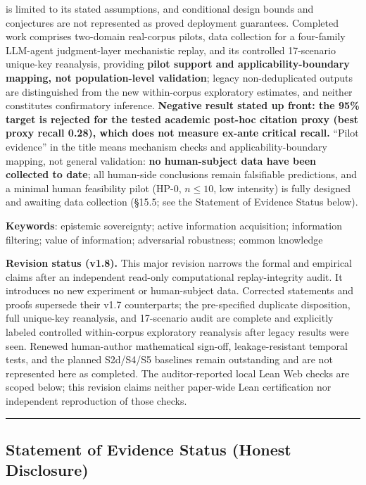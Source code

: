 \documentclass[
  11pt]{article}
\begin{document}
is limited to its stated assumptions, and conditional design bounds and
conjectures are not represented as proved deployment guarantees.
Completed work comprises two-domain real-corpus pilots, data collection
for a four-family LLM-agent judgment-layer mechanistic replay, and its
controlled 17-scenario unique-key reanalysis, providing \textbf{pilot
support and applicability-boundary mapping, not population-level
validation}; legacy non-deduplicated outputs are distinguished from the
new within-corpus exploratory estimates, and neither constitutes
confirmatory inference. \textbf{Negative result stated up front: the
95\% target is rejected for the tested academic post-hoc citation proxy
(best proxy recall 0.28), which does not measure ex-ante critical
recall.} ``Pilot evidence'' in the title means mechanism checks and
applicability-boundary mapping, not general validation: \textbf{no
human-subject data have been collected to date}; all human-side
conclusions remain falsifiable predictions, and a minimal human
feasibility pilot (HP-0, \(n \le 10\), low intensity) is fully designed
and awaiting data collection (§15.5; see the Statement of Evidence
Status below).

\textbf{Keywords}: epistemic sovereignty; active information
acquisition; information filtering; value of information; adversarial
robustness; common knowledge

\textbf{Revision status (v1.8).} This major revision narrows the formal
and empirical claims after an independent read-only computational
replay-integrity audit. It introduces no new experiment or human-subject
data. Corrected statements and proofs supersede their v1.7 counterparts;
the pre-specified duplicate disposition, full unique-key reanalysis, and
17-scenario audit are complete and explicitly labeled controlled
within-corpus exploratory reanalysis after legacy results were seen.
Renewed human-author mathematical sign-off, leakage-resistant temporal
tests, and the planned S2d/S4/S5 baselines remain outstanding and are
not represented here as completed. The auditor-reported local Lean Web
checks are scoped below; this revision claims neither paper-wide Lean
certification nor independent reproduction of those checks.

\begin{center}\rule{0.5\linewidth}{0.5pt}\end{center}

\subsection{Statement of Evidence Status (Honest
Disclosure)}\label{statement-of-evidence-status-honest-disclosure}
\end{document}
